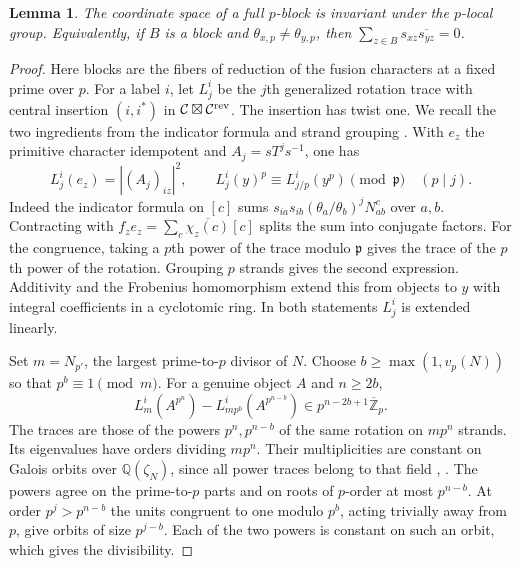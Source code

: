 \documentclass[11pt]{amsart}
\numberwithin{equation}{section}
\newtheorem{lemma}[theorem]{Lemma}
\begin{document}
\begin{lemma}\label{blk:local}
The coordinate space of a full $p$-block is invariant under the $p$-local group. Equivalently, if $B$ is a block and $\theta_{x,p}\ne\theta_{y,p}$, then $\sum_{z\in B}s_{xz}\overline{s_{yz}}=0$.
\end{lemma}
\begin{proof}
Here blocks are the fibers of reduction of the fusion characters at a fixed prime over $p$. For a label $i$, let $L_j^i$ be the $j$th generalized rotation trace with central insertion $(i,i^*)$ in $\mathcal C\boxtimes\mathcal C^{\rm rev}$. The insertion has twist one. We recall the two ingredients from the indicator formula and strand grouping \cite[Lemmas~2.5, 2.7, Proposition~2.8, Corollary~5.5 and Proposition~6.1]{NSind}. With $e_z$ the primitive character idempotent and $A_j=sT^js^{-1}$, one has
\[
 L_j^i(e_z)=|(A_j)_{iz}|^2,\qquad L_j^i(y)^p\equiv L_{j/p}^i(y^p)\pmod{\mathfrak p}\quad(p\mid j).
\]
Indeed the indicator formula on $[c]$ sums $s_{ia}s_{ib}(\theta_a/\theta_b)^jN_{ab}^c$ over $a,b$. Contracting with $f_z e_z=\sum_c\overline{\chi_z(c)}[c]$ splits the sum into conjugate factors. For the congruence, taking a $p$th power of the trace modulo $\mathfrak p$ gives the trace of the $p$th power of the rotation. Grouping $p$ strands gives the second expression. Additivity and the Frobenius homomorphism extend this from objects to $y$ with integral coefficients in a cyclotomic ring. In both statements $L_j^i$ is extended linearly.

Set $m=N_{p'}$, the largest prime-to-$p$ divisor of $N$. Choose $b\ge\max(1,v_p(N))$ so that $p^b\equiv1\pmod m$. For a genuine object $A$ and $n\ge2b$,
\[
 L_m^i(A^{p^n})-L_{mp^b}^i(A^{p^{n-b}})\in p^{n-2b+1}\overline{\mathbb Z}_p.
\]
The traces are those of the powers $p^n,p^{n-b}$ of the same rotation on $mp^n$ strands. Its eigenvalues have orders dividing $mp^n$. Their multiplicities are constant on Galois orbits over $\mathbb Q(\zeta_N)$, since all power traces belong to that field \cite[Proposition~5.7]{NSind}, \cite[Theorem~7.7]{NSfs}. The powers agree on the prime-to-$p$ parts and on roots of $p$-order at most $p^{n-b}$. At order $p^j>p^{n-b}$ the units congruent to one modulo $p^b$, acting trivially away from $p$, give orbits of size $p^{j-b}$. Each of the two powers is constant on such an orbit, which gives the divisibility.


\end{proof}
\end{document}
